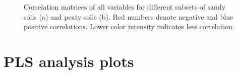 \documentclass[10pt,twoside,dutch,english]{report}
\begin{document}
\begin{appendices}
\begin{figure}[h] %
	\centering
	\caption{Correlation matrices of all variables for different subsets of sandy soils (a) and peaty soils (b). Red numbers denote negative and blue positive correlations. Lower color intensity indicates less correlation. }
	\label{fig:results_corr_min}
\end{figure}

\section{PLS analysis plots}
\label{chap:PLS}

\begin{figure}[H] %
		

\end{figure}
\end{appendices}
\end{document}

